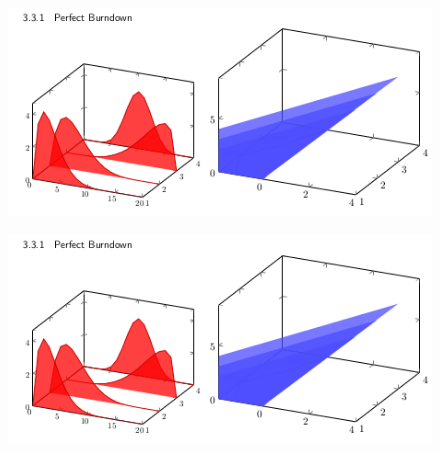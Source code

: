 \documentclass[twocolumn,landscape,8pt]{article}
\begin{document}
%

\begin{figure}[t]
{\footnotesize

}
\end{figure}

%

\begin{figure}[t]
  \centering\includegraphics[width=\columnwidth,height=0.1\textheight]{burndown}
\end{figure}

%

\begin{figure}[t]
  \centering\includegraphics[width=\columnwidth,height=0.1\textheight]{burndown}
\end{figure}
\end{document}
